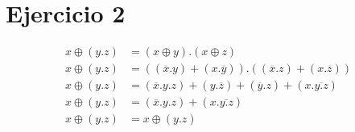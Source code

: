 \section*{Ejercicio 2}

\begin{align*}
    x \oplus (y.z) &= (x \oplus y).(x \oplus z) \\
    x \oplus (y.z) &= ((\overline{x}.y) + (x.\overline{y})).((\overline{x}.z) + (x.\overline{z})) \\
    x \oplus (y.z) &= (\overline{x}.y.z) + (y.\overline{z}) + (\overline{y}.z) + (x.\overline{y.z}) \\
    x \oplus (y.z) &= (\overline{x}.y.z) + (x.\overline{y.z}) \\
    x \oplus (y.z) &= x \oplus (y.z)
\end{align*}

